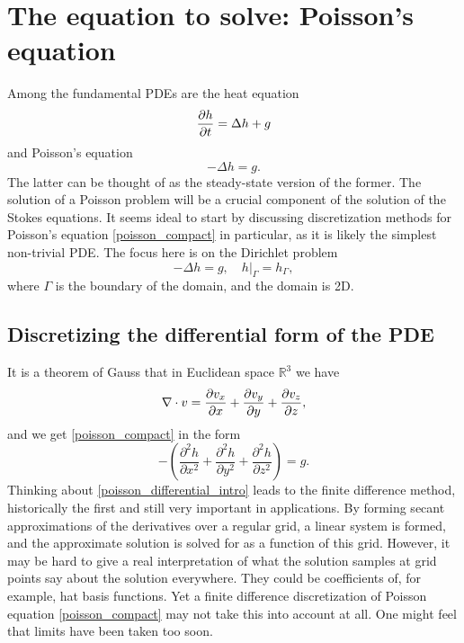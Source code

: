 \section{The equation to solve: Poisson's equation}

Among the fundamental PDEs
are the heat equation
    $$\frac{\partial h}{\partial t} = \Delta h + g$$
and Poisson's equation
\begin{equation}\label{poisson_compact}
    -\Delta h = g.
\end{equation}
The latter can be thought of as the steady-state version of the former. The solution of a Poisson problem will be a crucial component
of the solution of the Stokes equations. It seems ideal to start by discussing
discretization methods for Poisson's equation \eqref{poisson_compact} in particular,
as it is likely the simplest non-trivial PDE.
The focus here is on the Dirichlet problem
\begin{equation}\label{poisson_dirichlet_problem}
    -\Delta h = g, \quad \left.h\right|_{\Gamma} = h_\Gamma,
\end{equation}
where $\Gamma$ is the boundary of the domain, and the domain is 2D.

\subsection{Discretizing the differential form of the PDE}
It is a theorem of Gauss that in Euclidean space $\mathbb{R}^3$ we have
\begin{equation}\label{gauss_euclidean_divergence}
    \nabla \cdot v = \frac{\partial v_x}{\partial x} + \frac{\partial v_y}{\partial y} + \frac{\partial v_z}{\partial z},
\end{equation}
and we get \eqref{poisson_compact} in the form
\begin{equation}\label{poisson_differential_intro}
    -\left(\frac{\partial^2 h}{\partial x^2}
           +\frac{\partial^2 h}{\partial y^2}
           +\frac{\partial^2 h}{\partial z^2}\right) = g.
\end{equation}
Thinking about \eqref{poisson_differential_intro} leads to the finite difference method, historically the first and
still very important in applications.
By forming secant approximations of the derivatives over a regular grid, a linear system is formed, and the approximate solution is solved
for as a function of this grid.
However, it may be hard to give a real interpretation of what the solution samples at grid points say about the solution everywhere.
They could be coefficients of, for example, hat basis functions.
Yet a finite difference discretization of Poisson equation \eqref{poisson_compact} may not take this into account at all. One might feel that
limits have been taken too soon.

